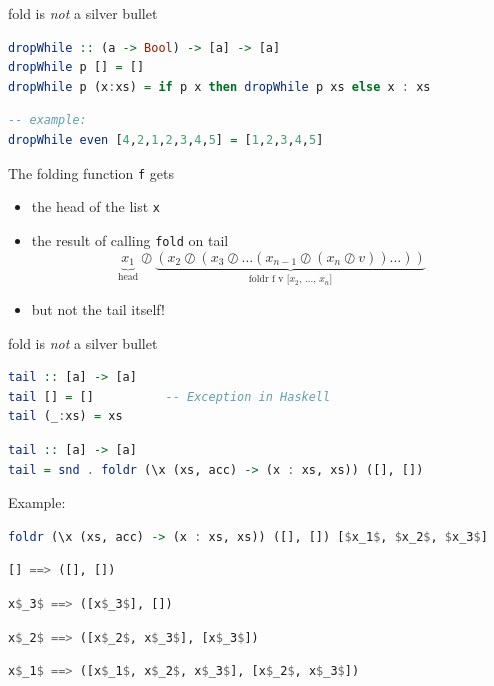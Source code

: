 \documentclass[lualatex]{beamer}
\renewcommand{\_}{\textscale{.6}{\textunderscore}}
\begin{document}
\begin{frame}[fragile]{fold is \emph{not} a silver bullet}

\begin{lstlisting}[language=Haskell, morekeywords={foldr}]
dropWhile :: (a -> Bool) -> [a] -> [a]
dropWhile p [] = []
dropWhile p (x:xs) = if p x then dropWhile p xs else x : xs
\end{lstlisting}
\begin{lstlisting}[language=Haskell, morekeywords={foldr}]
-- example:
dropWhile even [4,2,1,2,3,4,5] = [1,2,3,4,5]
\end{lstlisting}
\pause
The folding function \texttt{f} gets
\begin{itemize}
\item{the head of the list \texttt{x}}
\pause
\item{the result of calling \texttt{fold} on tail}
\pause
\[
\underbrace{x_1}_\text{head} \oslash
\underbrace{(x_2 \oslash (x_3 \oslash ... (x_{n-1} \oslash (x_n \oslash v)) ... ))}_\text{foldr f v [$x_2$, ..., $x_n$]}
\]
\pause
\item{but not the tail itself!}
\end{itemize}
\end{frame}
\begin{frame}[fragile]{fold is \emph{not} a silver bullet}
\begin{lstlisting}[language=Haskell, morekeywords={foldr}]
tail :: [a] -> [a]
tail [] = []          -- Exception in Haskell
tail (_:xs) = xs
\end{lstlisting}
\pause
\begin{lstlisting}[language=Haskell, morekeywords={foldr}]
tail :: [a] -> [a]
tail = snd . foldr (\x (xs, acc) -> (x : xs, xs)) ([], [])
\end{lstlisting}
\pause
Example:
\begin{lstlisting}[language=Haskell, morekeywords={foldr}]
foldr (\x (xs, acc) -> (x : xs, xs)) ([], []) [$x_1$, $x_2$, $x_3$]
\end{lstlisting}\pause
\begin{lstlisting}[language=Haskell, morekeywords={foldr}]
[] ==> ([], [])
\end{lstlisting}\pause
\begin{lstlisting}[language=Haskell, morekeywords={foldr}]
x$_3$ ==> ([x$_3$], [])
\end{lstlisting}\pause
\begin{lstlisting}[language=Haskell, morekeywords={foldr}]
x$_2$ ==> ([x$_2$, x$_3$], [x$_3$])
\end{lstlisting}\pause
\begin{lstlisting}[language=Haskell, morekeywords={foldr}]
x$_1$ ==> ([x$_1$, x$_2$, x$_3$], [x$_2$, x$_3$])
\end{lstlisting}
\end{frame}
\end{document}
